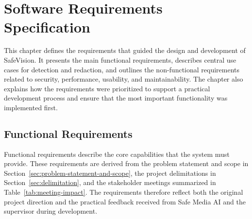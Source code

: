 \chapter{Software Requirements Specification}
\label{chap:software_requirements_specification}

This chapter defines the requirements that guided the design and development of \gls{SafeVision}. It presents the main functional requirements, describes central use cases for detection and redaction, and outlines the non-functional requirements related to security, performance, usability, and maintainability. The chapter also explains how the requirements were prioritized to support a practical development process and ensure that the most important functionality was implemented first.


\section{Functional Requirements}

Functional requirements describe the core capabilities that the system must provide. These requirements are derived from the problem statement and scope in Section~\ref{sec:problem-statement-and-scope}, the project delimitations in Section~\ref{sec:delimitation}, and the stakeholder meetings summarized in Table~\ref{tab:meeting-impact}. The requirements therefore reflect both the original project direction and the practical feedback received from Safe Media AI and the supervisor during development.

